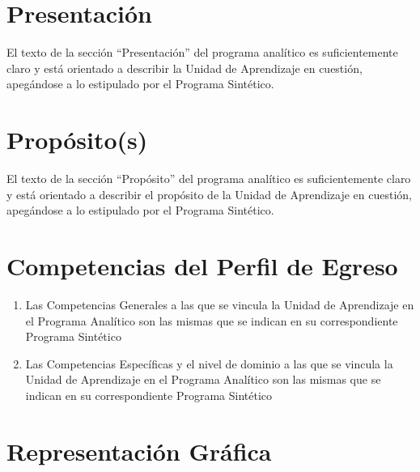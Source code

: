 \documentclass{article}
\begin{document}
\begin{Form}
\begin{enumerate}[resume,leftmargin=*,nolistsep]
\end{enumerate}
  
\section{Presentaci\'{o}n}

El texto de la secci\'{o}n ``Presentaci\'{o}n'' del programa
anal\'{i}tico es suficientemente claro y est\'{a} orientado a
describir la Unidad de Aprendizaje en cuesti\'{o}n, apeg\'{a}ndose a
lo estipulado por el Programa Sint\'{e}tico.   \hfill {}%
  \quad%

\section{Prop\'{o}sito(s)}

El texto de la secci\'{o}n ``Prop\'{o}sito'' del programa
anal\'{i}tico es suficientemente claro y est\'{a} orientado a
describir el prop\'{o}sito de la Unidad de Aprendizaje en
cuesti\'{o}n, apeg\'{a}ndose a lo estipulado por el Programa
Sint\'{e}tico.   \hfill {}%
  \quad%

\section{Competencias del Perfil de Egreso}

\begin{enumerate}[resume,leftmargin=*,nolistsep]
\item{Las Competencias Generales a las que se vincula la Unidad de Aprendizaje en el
Programa Anal\'{i}tico son las mismas que se indican en su correspondiente Programa
Sint\'{e}tico   \hfill {}%
  \quad%
  }
\item{Las Competencias Espec\'{i}ficas y el nivel de dominio a las que se vincula la Unidad de
Aprendizaje en el Programa Anal\'{i}tico son las mismas que se indican en su correspondiente
Programa Sint\'{e}tico   \hfill {}%
  \quad%
  }
\end{enumerate}

\section{Representaci\'{o}n Gr\'{a}fica}


\end{Form}
\end{document}
